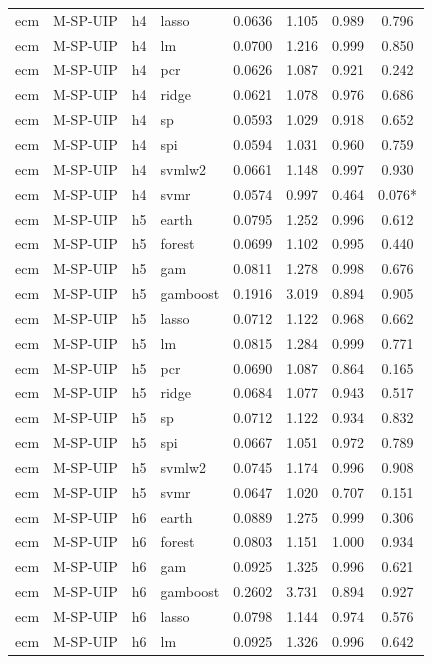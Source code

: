 \begin{ThreePartTable}
\begin{longtable}[t]{llclcccc}
ecm & M-SP-UIP & h4 & lasso & 0.0636 & 1.105 & 0.989 & 0.796\\
ecm & M-SP-UIP & h4 & lm & 0.0700 & 1.216 & 0.999 & 0.850\\
ecm & M-SP-UIP & h4 & pcr & 0.0626 & 1.087 & 0.921 & 0.242\\
ecm & M-SP-UIP & h4 & ridge & 0.0621 & 1.078 & 0.976 & 0.686\\
ecm & M-SP-UIP & h4 & sp & 0.0593 & 1.029 & 0.918 & 0.652\\
ecm & M-SP-UIP & h4 & spi & 0.0594 & 1.031 & 0.960 & 0.759\\
ecm & M-SP-UIP & h4 & svmlw2 & 0.0661 & 1.148 & 0.997 & 0.930\\
ecm & M-SP-UIP & h4 & svmr & 0.0574 & 0.997 & 0.464 & 0.076*\\
\addlinespace
ecm & M-SP-UIP & h5 & earth & 0.0795 & 1.252 & 0.996 & 0.612\\
ecm & M-SP-UIP & h5 & forest & 0.0699 & 1.102 & 0.995 & 0.440\\
ecm & M-SP-UIP & h5 & gam & 0.0811 & 1.278 & 0.998 & 0.676\\
ecm & M-SP-UIP & h5 & gamboost & 0.1916 & 3.019 & 0.894 & 0.905\\
ecm & M-SP-UIP & h5 & lasso & 0.0712 & 1.122 & 0.968 & 0.662\\
ecm & M-SP-UIP & h5 & lm & 0.0815 & 1.284 & 0.999 & 0.771\\
ecm & M-SP-UIP & h5 & pcr & 0.0690 & 1.087 & 0.864 & 0.165\\
ecm & M-SP-UIP & h5 & ridge & 0.0684 & 1.077 & 0.943 & 0.517\\
ecm & M-SP-UIP & h5 & sp & 0.0712 & 1.122 & 0.934 & 0.832\\
ecm & M-SP-UIP & h5 & spi & 0.0667 & 1.051 & 0.972 & 0.789\\
ecm & M-SP-UIP & h5 & svmlw2 & 0.0745 & 1.174 & 0.996 & 0.908\\
ecm & M-SP-UIP & h5 & svmr & 0.0647 & 1.020 & 0.707 & 0.151\\
\addlinespace
ecm & M-SP-UIP & h6 & earth & 0.0889 & 1.275 & 0.999 & 0.306\\
ecm & M-SP-UIP & h6 & forest & 0.0803 & 1.151 & 1.000 & 0.934\\
ecm & M-SP-UIP & h6 & gam & 0.0925 & 1.325 & 0.996 & 0.621\\
ecm & M-SP-UIP & h6 & gamboost & 0.2602 & 3.731 & 0.894 & 0.927\\
ecm & M-SP-UIP & h6 & lasso & 0.0798 & 1.144 & 0.974 & 0.576\\
ecm & M-SP-UIP & h6 & lm & 0.0925 & 1.326 & 0.996 & 0.642\\

\end{longtable}
\end{ThreePartTable}
